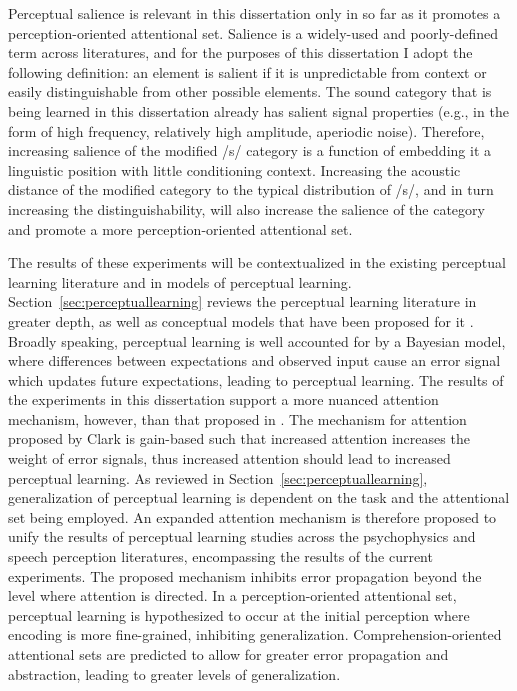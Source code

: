 Perceptual salience is relevant in this dissertation only in so far as it promotes a perception-oriented attentional set.
Salience is a widely-used and poorly-defined term across literatures, and for the purposes of this dissertation I adopt the following definition:  an element is salient if it is unpredictable from context or easily distinguishable from other possible elements.  
The sound category that is being learned in this dissertation already has salient signal properties (e.g., in the form of high frequency, relatively high amplitude, aperiodic noise).
Therefore, increasing salience of the modified /s/ category is a function of embedding it a linguistic position with little conditioning context.  
Increasing the acoustic distance of the modified category to the typical distribution of /s/, and in turn increasing the distinguishability, will also increase the salience of the category and promote a more perception-oriented attentional set.

The results of these experiments will be contextualized in the existing perceptual learning literature and in models of perceptual learning.
Section~\ref{sec:perceptuallearning} reviews the perceptual learning literature in greater depth, as well as conceptual models that have been proposed for it \citep{Clark2013, Kleinschmidt2011}.
Broadly speaking, perceptual learning is well accounted for by a Bayesian model, where differences between expectations and observed input cause an error signal which updates future expectations, leading to perceptual learning.
The results of the experiments in this dissertation support a more nuanced attention mechanism, however, than that proposed in \citet{Clark2013}.
The mechanism for attention proposed by Clark is gain-based such that increased attention increases the weight of error signals, thus increased attention should lead to increased perceptual learning.
As reviewed in Section~\ref{sec:perceptuallearning}, generalization of perceptual learning is dependent on the task and the attentional set being employed.
An expanded attention mechanism is therefore proposed to unify the results of perceptual learning studies across the psychophysics and speech perception literatures, encompassing the results of the current experiments.
The proposed mechanism inhibits error propagation beyond the level where attention is directed.  In a perception-oriented attentional set, perceptual learning is hypothesized to occur at the initial perception where encoding is more fine-grained, inhibiting generalization.  
Comprehension-oriented attentional sets are predicted to allow for greater error propagation and abstraction, leading to greater levels of generalization.

